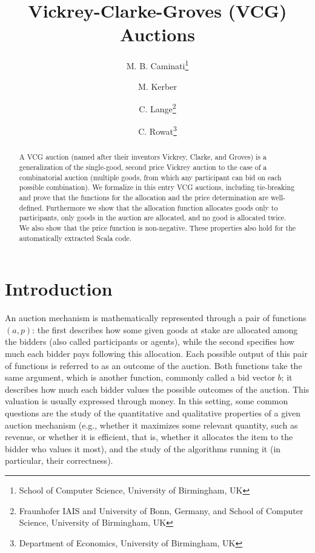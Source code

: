 \documentclass[11pt,a4paper]{article}
\begin{document}
\title{Vickrey-Clarke-Groves (VCG) Auctions}
\author{M. B. Caminati\footnote{School of Computer Science, University of Birmingham, UK}\addtocounter{footnote}{-1}
  \and M. Kerber\footnotemark
  \and C. Lange\footnote{Fraunhofer IAIS and University of Bonn, Germany, and School of Computer Science, University of Birmingham, UK}
  \and C. Rowat\footnote{Department of Economics, University of Birmingham, UK}}
\maketitle

\begin{abstract}
A VCG auction (named after their inventors Vickrey, Clarke, and
Groves) is a generalization of the single-good, second price Vickrey
auction to the case of a combinatorial auction (multiple goods, from
which any participant can bid on each possible combination). We
formalize in this entry VCG auctions, including tie-breaking and prove
that the functions for the allocation and the price determination are
well-defined. Furthermore we show that the allocation function
allocates goods only to participants, only goods in the auction are
allocated, and no good is allocated twice. We also show that the price
function is non-negative. These properties also hold for the
automatically extracted Scala code.
\end{abstract}




\tableofcontents

\section{Introduction}
An auction mechanism is mathematically represented through a pair of
functions $(a, p)$: the first describes how some given goods at stake
are allocated among the bidders (also called participants or agents),
while the second specifies how much each bidder pays following this
allocation.  Each possible output of this pair of functions is
referred to as an outcome of the auction. Both functions take the same
argument, which is another function, commonly called a bid vector $b$;
it describes how much each bidder values the possible outcomes of the
auction. This valuation is usually expressed through money.  In this
setting, some common questions are the study of the quantitative and
qualitative properties of a given auction mechanism (e.g., whether it
maximizes some relevant quantity, such as revenue, or whether it is
efficient, that is, whether it allocates the item to the bidder who
values it most), and the study of the algorithms running it (in
particular, their correctness).
\end{document}
